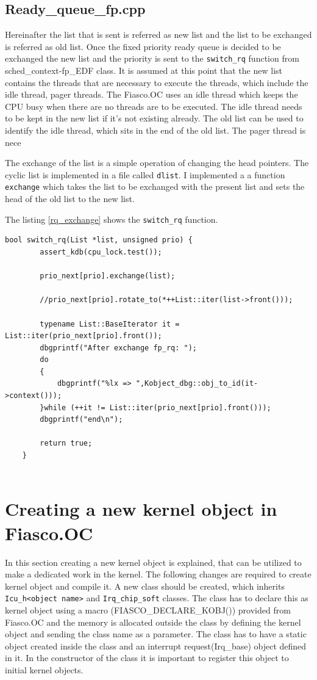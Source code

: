 \subsection{Ready\_queue\_fp.cpp}
Hereinafter the list that is sent is referred as new list and the list to be exchanged is referred as old list. Once the fixed priority ready queue is decided to be exchanged the new list and the priority is sent to the \texttt{switch\_rq} function from sched\_context-fp\_EDF class. It is assumed at this point that the new list contains the threads that are necessary to execute the threads, which include the idle thread, pager threads. The Fiasco.OC uses an idle thread which keeps the CPU busy when there are no threads are to be executed. The idle thread needs to be kept in the new list if it's not existing already. The old list can be used to identify the idle thread, which sits in the end of the old list. The pager thread is nece

The exchange of the list is a simple operation of changing the head pointers. The cyclic list is implemented in a file called \texttt{dlist}. I implemented a a function \texttt{exchange} which takes the list to be exchanged with the present list and sets the head of the old list to the new list. 

The listing \ref{rq_exchange} shows the \texttt{switch\_rq} function.

 \begin{lstlisting}[caption={Exchanging the ready queue},label=rq_exchange, style=customcpp]
 bool switch_rq(List *list, unsigned prio) {
   		assert_kdb(cpu_lock.test());
 
   		prio_next[prio].exchange(list);
 
   		//prio_next[prio].rotate_to(*++List::iter(list->front()));
 
   		typename List::BaseIterator it = List::iter(prio_next[prio].front());
   		dbgprintf("After exchange fp_rq: ");
   		do
   		{
   			dbgprintf("%lx => ",Kobject_dbg::obj_to_id(it->context()));
   		}while (++it != List::iter(prio_next[prio].front()));
   		dbgprintf("end\n");
 
   		return true;
   	}
 
\end{lstlisting} 

\section{Creating a new kernel object in Fiasco.OC}\label{implement:kernelobject}
In this section creating a new kernel object is explained, that can be utilized to make a dedicated work in the kernel. The following changes are required to create kernel object and compile it. A new class should be created, which inherits \texttt{Icu\_h<object name>} and
\texttt{Irq\_chip\_soft} classes. The class has to declare this as kernel object using a macro (FIASCO\_DECLARE\_KOBJ()) provided from Fiasco.OC and the memory is allocated outside the class by defining the kernel object and sending the class name as a parameter. The class has to have a static object created inside the class and an interrupt request(Irq\_base) object defined in it. In the constructor of the class it is important to register this object to initial kernel objects. 

